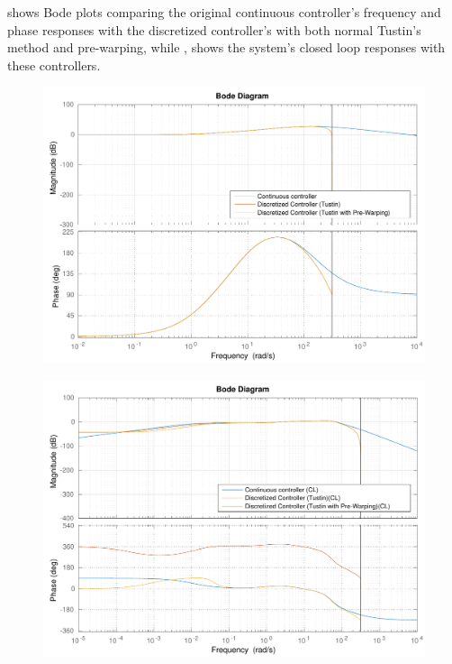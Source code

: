  shows Bode plots comparing the original continuous controller's frequency and phase responses with the discretized controller's with both normal Tustin's method and pre-warping, while , shows the system's closed loop responses with these controllers.\\ 
% 
\begin{minipage}{\linewidth}
  \begin{minipage}{0.45\linewidth}
    \begin{figure}[H]
      \includegraphics[scale=.4]{figures/prewarpVsNoPrewarpVsContinuousBode.pdf}
      \centering
      \captionsetup{justification=centering}
      \label{fig:bodePrewarpVsNoPrewarpVsContinuous}
    \end{figure}\vspace{-5mm}
  \end{minipage}
  \hspace{0.03\linewidth}
  \begin{minipage}{0.45\linewidth}
    \begin{figure}[H]
      \includegraphics[scale=.4]{figures/prewarpVsNoPrewarpVsContinuousBodeClosedLoop.pdf}

\end{figure}
\end{minipage}
\end{minipage}

